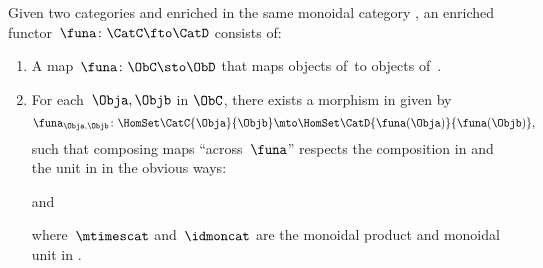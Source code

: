\begin{ctdefinition}
	\label{def:enrichedfunctor}
	Given two categories \CatC and \CatD enriched in the same monoidal category \CatV, an enriched functor~$\funa\colon \CatC \fto \CatD$ consists of:
	\begin{enumerate}
		\item A map~$\funa\colon \ObC \sto \ObD$ that maps objects of~\CatC to objects of~\CatD.
		\item For each~$\Obja, \Objb$ in $\ObC$, there exists a morphism in \CatV given by
		      \begin{equation*}
			      \funa_{\Obja, \Objb} \colon \HomSet\CatC{\Obja}{\Objb} \mto \HomSet\CatD{\funa(\Obja)}{\funa(\Objb)},
		      \end{equation*}
		      such that composing maps ``across~$\funa$'' respects the composition in \CatC and the unit in \CatV in the obvious ways:
		      \begin{center}
		      \end{center}
		      and
		      \begin{center}
		      \end{center}
		      where~$\mtimescat$ and~$\idmoncat$ are the monoidal product and monoidal unit in \CatV.
	\end{enumerate}
\end{ctdefinition}


